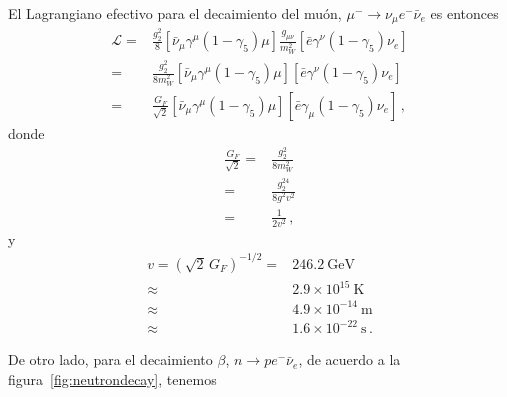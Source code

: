 \begin{frame}
El Lagrangiano efectivo para el decaimiento del muón, $\mu^-\to \nu_\mu e^- \bar{\nu}_e$ es entonces
\begin{align}
  \mathcal{L}=&\frac{g_2^2}{8}\left[\bar{\nu}_\mu\gamma^\mu(1-\gamma_5)\mu\right]\frac{g_{\mu\nu}}{m_W^2}
  \left[\bar{e}\gamma^\nu(1-\gamma_5)\nu_e\right]\nonumber\\
=&\frac{g_2^2}{8m_W^2}\left[\bar{\nu}_\mu\gamma^\mu(1-\gamma_5)\mu\right]
  \left[\bar{e}\gamma^\nu(1-\gamma_5)\nu_e\right]\nonumber\\
  =&\frac{G_F}{\sqrt{2}}\left[\bar{\nu}_\mu\gamma^\mu(1-\gamma_5)\mu\right]\left[\bar{e}\gamma_\mu(1-\gamma_5)\nu_e\right]\,,
\end{align}
donde
\begin{align}
  \frac{G_F}{\sqrt{2}}=&\frac{g_2^2}{8m_W^2}\nonumber\\
  =&\frac{g_2^24}{8g^2v^2}\nonumber\\
  =&\frac{1}{2v^2}\,,
\end{align}
y
\begin{align}
  v=\left(\sqrt{2}\,G_F\right)^{-1/2}=&246.2\ \text{GeV}\nonumber\\
 \approx&2.9\times 10^{15}\ \text{K} \nonumber\\
 \approx&4.9\times 10^{-14}\ \text{m} \nonumber\\
 \approx&1.6\times 10^{-22}\ \text{s} \,.
\end{align}


De otro lado, para el  decaimiento $\beta$, $n\to p e^- \bar{\nu}_e$, de acuerdo a la figura~\ref{fig:neutrondecay}, tenemos


\end{frame}
